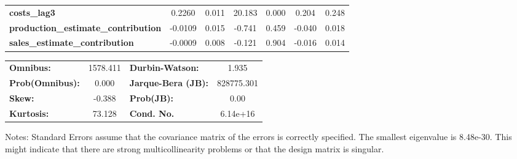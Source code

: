 \begin{center}
\begin{tabular}{lcccccc}
\textbf{costs\_lag3}                        &       0.2260  &        0.011     &    20.183  &         0.000        &        0.204    &        0.248     \\
\textbf{production\_estimate\_contribution} &      -0.0109  &        0.015     &    -0.741  &         0.459        &       -0.040    &        0.018     \\
\textbf{sales\_estimate\_contribution}      &      -0.0009  &        0.008     &    -0.121  &         0.904        &       -0.016    &        0.014     \\
\bottomrule
\end{tabular}
\begin{tabular}{lclc}
\textbf{Omnibus:}       & 1578.411 & \textbf{  Durbin-Watson:     } &     1.935   \\
\textbf{Prob(Omnibus):} &   0.000  & \textbf{  Jarque-Bera (JB):  } & 828775.301  \\
\textbf{Skew:}          &  -0.388  & \textbf{  Prob(JB):          } &      0.00   \\
\textbf{Kurtosis:}      &  73.128  & \textbf{  Cond. No.          } &  6.14e+16   \\
\bottomrule
\end{tabular}
\end{center}

Notes: \newline
 [1] Standard Errors assume that the covariance matrix of the errors is correctly specified. \newline
 [2] The smallest eigenvalue is 8.48e-30. This might indicate that there are \newline
 strong multicollinearity problems or that the design matrix is singular.